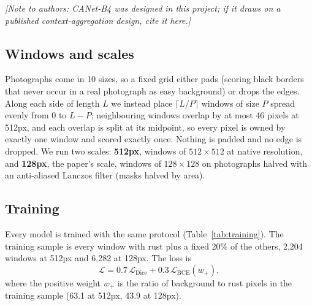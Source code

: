 \documentclass[11pt,a4paper]{article}
\newcommand{\note}[1]{\textcolor{blue!60!black}{\textit{[Note to authors: #1]}}}
\begin{document}
\note{CANet-B4 was designed in this project; if it draws on a published context-aggregation design,
cite it here.}

\subsection{Windows and scales}
Photographs come in 10 sizes, so a fixed grid either pads (scoring black borders that never occur
in a real photograph as easy background) or drops the edges. Along each side of length $L$ we
instead place $\lceil L/P\rceil$ windows of size $P$ spread evenly from $0$ to $L-P$; neighbouring
windows overlap by at most 46 pixels at 512px, and each overlap is split at its midpoint, so every
pixel is owned by exactly one window and scored exactly once. Nothing is padded and no edge is
dropped. We run two scales: \textbf{512px}, windows of $512\times512$ at native resolution, and
\textbf{128px}, the paper's scale, windows of $128\times128$ on photographs halved with an
anti-aliased Lanczos filter (masks halved by area).

\subsection{Training}
\label{sec:training}
Every model is trained with the same protocol (Table~\ref{tab:training}). The training sample is
every window with rust plus a fixed 20\% of the others, 2,204 windows at 512px and 6,282 at 128px.
The loss is
\begin{equation}
\mathcal{L} = 0.7\,\mathcal{L}_{\mathrm{Dice}} + 0.3\,\mathcal{L}_{\mathrm{BCE}}(w_{+}),
\end{equation}
where the positive weight $w_{+}$ is the ratio of background to rust pixels in the training sample
(63.1 at 512px, 43.9 at 128px).
\end{document}
